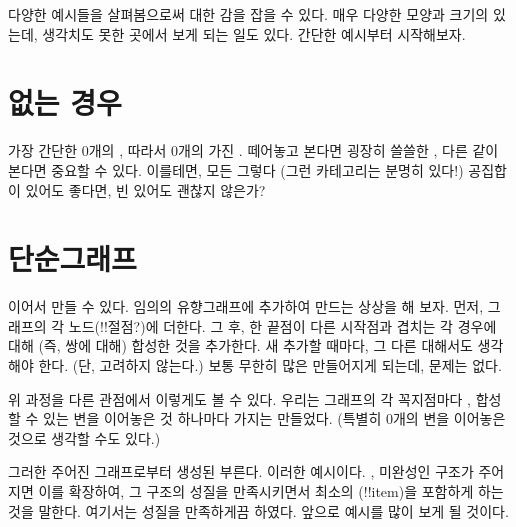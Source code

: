 
\lettrine[lhang=0.17]{다}{양한 예시들을} 살펴봄으로써  대한 감을 잡을 수 있다.
매우 다양한 모양과 크기의  있는데, 생각치도 못한 곳에서  보게 되는 일도 있다.
간단한 예시부터 시작해보자.

\section{ 없는 경우}

가장 간단한  0개의 \trObject, 따라서 0개의  가진 . 
떼어놓고 본다면 굉장히 쓸쓸한 , 다른  같이 본다면 중요할 수 있다.
이를테면, 모든   그렇다 (그런 카테고리는 분명히 있다!)
공집합이 있어도 좋다면, 빈  있어도 괜찮지 않은가?

\section{단순그래프}

  이어서  만들 수 있다.
임의의 유향그래프에  추가하여  만드는 상상을 해 보자.
먼저, 그래프의 각 노드(!!절점?)에 \trIdentity  {} 더한다. 
그 후, 한  끝점이 다른  시작점과 겹치는 각 경우에 대해
(즉,  쌍에 대해)  합성한 것을 추가한다.
새  추가할 때마다, 그  다른   대해서도 생각해야 한다.
(단, \trIdentity  {} 고려하지 않는다.)
보통 무한히 많은  만들어지게 되는데, 문제는 없다.

위 과정을 다른 관점에서 이렇게도 볼 수 있다. 우리는 그래프의 각 꼭지점마다 , 
합성할 수 있는 변을 이어놓은 것 하나마다  가지는  만들었다.
( 특별히 0개의 변을 이어놓은 것으로 생각할 수도 있다.)

그러한  주어진 그래프로부터 생성된  부른다.
이러한   예시이다. ,
미완성인 구조가 주어지면 이를 확장하여, 그 구조의 성질을 만족시키면서 최소의 (!!item)을 포함하게 하는 것을 말한다.
여기서는  성질을 만족하게끔 하였다. 
앞으로  예시를 많이 보게 될 것이다.

\section{\trOrder}

